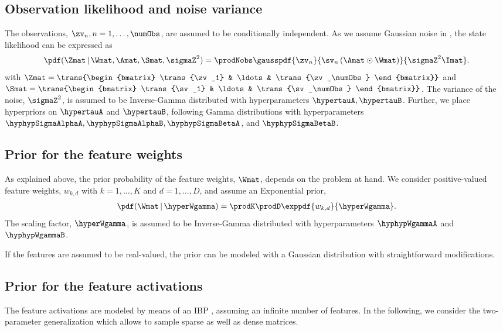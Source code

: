 \documentclass{article}
\begin{document}
\subsection{Observation likelihood and noise variance}
The observations, $\zv_n, n=1,\ldots,\numObs$, are assumed to be conditionally independent. 
As we assume Gaussian noise in , the state likelihood can be expressed as
\begin{align}
 \pdf(\Zmat \, | \, \Wmat, \Amat, \Smat, \sigmaZ^2) = \prodNobs \gausspdf{\zv_n}{\sv_n \left( \Amat \odot \Wmat\right)}{\sigmaZ^2 \Imat}.
 \label{eq::bnfl::likelihood}
\end{align}
with $\Zmat = \trans{\begin{bmatrix} \trans{\zv_1} & \ldots & \trans{\zv_\numObs} \end{bmatrix}}$ and $\Smat = \trans{\begin{bmatrix} \trans{\sv_1} & \ldots & \trans{\sv_\numObs} \end{bmatrix}}$.
The variance of the noise, $\sigmaZ^2$, is assumed to be Inverse-Gamma distributed with hyperparameters $\hypertauA, \hypertauB$.
Further, we place hyperpriors on $\hypertauA$ and $\hypertauB$, following Gamma distributions with hyperparameters $\hyphypSigmaAlphaA, \hyphypSigmaAlphaB, \hyphypSigmaBetaA$, and $\hyphypSigmaBetaB$.

\subsection{Prior for the feature weights}
As explained above, the prior probability of the feature weights, $\Wmat$, depends on the problem at hand.
We consider \iid positive-valued feature weights, $w_{k,d}$ with $k=1,\ldots,K$ and $d=1,\ldots,D$, and assume an Exponential prior, 
\begin{align*}
 \pdf(\Wmat \,|\, \hyperWgamma) = \prodK \prodD \exppdf{w_{k,d}}{\hyperWgamma}.
\end{align*}
The scaling factor, $\hyperWgamma$, is assumed to be Inverse-Gamma distributed with hyperparameters $\hyphypWgammaA$ and $\hyphypWgammaB$. 

If the features are assumed to be real-valued, the prior can be modeled with a Gaussian distribution with straightforward modifications.

\subsection{Prior for the feature activations}
The feature activations are modeled by means of an \ac{IBP} \cite{Ghahramani2005,Griffiths2011}, assuming an infinite number of features. 
In the following, we consider the two-parameter generalization \cite{Ghahramani2007} which allows to sample sparse as well as dense matrices.
\end{document}
